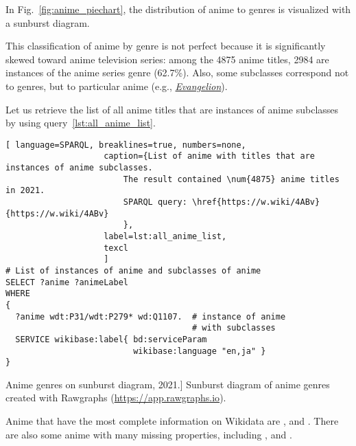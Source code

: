 In Fig.~\ref{fig:anime_piechart}, the distribution of anime to genres is visualized with a sunburst diagram.

This classification of anime by genre is not perfect because it is significantly skewed toward anime television series: among the \num{4875} anime titles, \num{2984} are instances of the anime series genre (\num{62.7}\%). Also, some subclasses correspond not to genres, but to particular anime (e.g., \href{https://w.wiki/3iKe}{\emph{Evangelion}}).

Let us retrieve the list of all anime titles that are instances of anime subclasses by using query~\ref{lst:all_anime_list}.

\begin{lstlisting}[ language=SPARQL, breaklines=true, numbers=none,
                    caption={List of anime with titles that are instances of anime subclasses.
                        The result contained \num{4875} anime titles in 2021.
                        SPARQL query: \href{https://w.wiki/4ABv}{https://w.wiki/4ABv}
                        },
                    label=lst:all_anime_list,
                    texcl 
                    ]
# List of instances of anime and subclasses of anime
SELECT ?anime ?animeLabel
WHERE
{
  ?anime wdt:P31/wdt:P279* wd:Q1107.  # instance of anime
                                      # with subclasses
  SERVICE wikibase:label{ bd:serviceParam 
                          wikibase:language "en,ja" }
}
\end{lstlisting}%

\begin{marginfigure}[0.0cm]
{
	\setlength{\fboxsep}{0pt}%
	\setlength{\fboxrule}{1pt}%
}
\caption
[Anime genres on sunburst diagram, 2021.]
{
Sunburst diagram of anime genres created with Rawgraphs (\href{https://app.rawgraphs.io}{https://app.rawgraphs.io}).\newline
}
\label{fig:anime_piechart}
\end{marginfigure}

Anime that have the most complete information on Wikidata are ,  and . There are also some anime with many missing properties, including ,  and .

